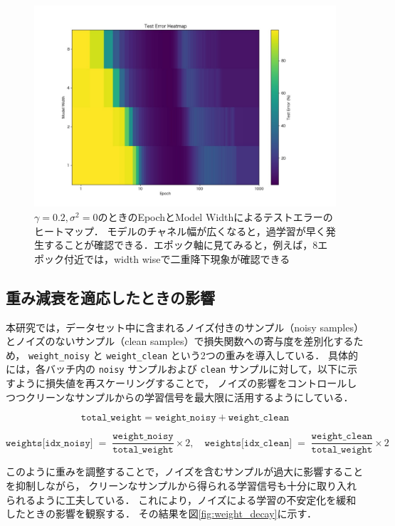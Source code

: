 \begin{figure}[H]
    \centering
    \includegraphics[width=\linewidth]{fig/test_error_heatmap_ln0.2.pdf}
    \caption[$\gamma = 0.2, \sigma^2 = 0$のときのEpochとModel Widthによるテストエラーのヒートマップ]{$\gamma = 0.2, \sigma^2 = 0$のときのEpochとModel Widthによるテストエラーのヒートマップ．
    モデルのチャネル幅が広くなると，過学習が早く発生することが確認できる．エポック軸に見てみると，例えば，8エポック付近では，width wiseで二重降下現象が確認できる}
    \label{fig:modelwidth_heatmap}
\end{figure}

\newpage

\subsection{重み減衰を適応したときの影響}
本研究では，データセット中に含まれるノイズ付きのサンプル（noisy samples）とノイズのないサンプル（clean samples）で損失関数への寄与度を差別化するため，
\texttt{weight\_noisy} と \texttt{weight\_clean} という2つの重みを導入している．
具体的には，各バッチ内の \texttt{noisy} サンプルおよび \texttt{clean} サンプルに対して，以下に示すように損失値を再スケーリングすることで，
ノイズの影響をコントロールしつつクリーンなサンプルからの学習信号を最大限に活用するようにしている．

\[
\texttt{total\_weight} = \texttt{weight\_noisy} + \texttt{weight\_clean}
\]

\[
\texttt{weights[idx\_noisy]} \;=\; \frac{\texttt{weight\_noisy}}{\texttt{total\_weight}} \times 2,
\quad
\texttt{weights[idx\_clean]} \;=\; \frac{\texttt{weight\_clean}}{\texttt{total\_weight}} \times 2
\]

このように重みを調整することで，ノイズを含むサンプルが過大に影響することを抑制しながら，
クリーンなサンプルから得られる学習信号も十分に取り入れられるように工夫している．
これにより，ノイズによる学習の不安定化を緩和したときの影響を観察する．
その結果を図\ref{fig:weight_decay}に示す．

